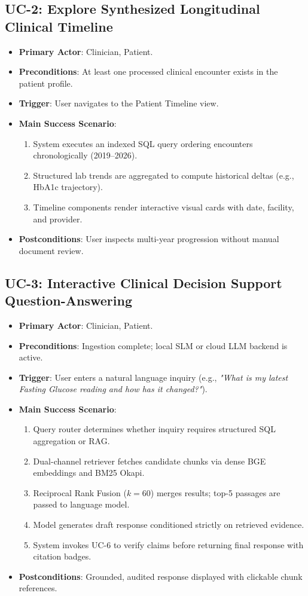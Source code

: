 \subsection{UC-2: Explore Synthesized Longitudinal Clinical Timeline}
\begin{itemize}
    \item \textbf{Primary Actor}: Clinician, Patient.
    \item \textbf{Preconditions}: At least one processed clinical encounter exists in the patient profile.
    \item \textbf{Trigger}: User navigates to the Patient Timeline view.
    \item \textbf{Main Success Scenario}:
    \begin{enumerate}
        \item System executes an indexed SQL query ordering encounters chronologically (2019--2026).
        \item Structured lab trends are aggregated to compute historical deltas (e.g., HbA1c trajectory).
        \item Timeline components render interactive visual cards with date, facility, and provider.
    \end{enumerate}
    \item \textbf{Postconditions}: User inspects multi-year progression without manual document review.
\end{itemize}

\subsection{UC-3: Interactive Clinical Decision Support Question-Answering}
\begin{itemize}
    \item \textbf{Primary Actor}: Clinician, Patient.
    \item \textbf{Preconditions}: Ingestion complete; local SLM or cloud LLM backend is active.
    \item \textbf{Trigger}: User enters a natural language inquiry (e.g., \textit{"What is my latest Fasting Glucose reading and how has it changed?"}).
    \item \textbf{Main Success Scenario}:
    \begin{enumerate}
        \item Query router determines whether inquiry requires structured SQL aggregation or RAG.
        \item Dual-channel retriever fetches candidate chunks via dense BGE embeddings and BM25 Okapi.
        \item Reciprocal Rank Fusion ($k=60$) merges results; top-5 passages are passed to language model.
        \item Model generates draft response conditioned strictly on retrieved evidence.
        \item System invokes UC-6 to verify claims before returning final response with citation badges.
    \end{enumerate}
    \item \textbf{Postconditions}: Grounded, audited response displayed with clickable chunk references.
\end{itemize}

